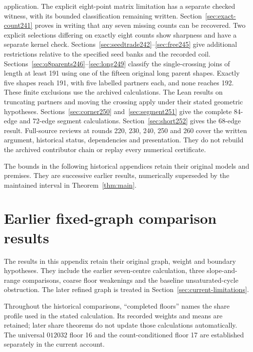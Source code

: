 \documentclass[11pt,a4paper]{article}
\theoremstyle{definition}
\theoremstyle{remark}
\begin{document}
application. The explicit eight-point matrix limitation has a separate
checked witness, with its bounded classification remaining written.
Section~\ref{sec:exact-count241} proves in writing that any seven
missing counts can be recovered. Two explicit selections differing on
exactly eight counts show sharpness and have a separate kernel check.
Sections~\ref{sec:seedtrade242}--\ref{sec:free245} give additional
restrictions relative to the specified seed banks and the recorded coil.
Sections~\ref{sec:q8parents246}--\ref{sec:long249} classify the
single-crossing joins of length at least 191 using one of the fifteen
original long parent shapes. Exactly five shapes reach 191, with five
labelled partners each, and none reaches 192. These finite exclusions
use the archived calculations. The Lean results on truncating partners
and moving the crossing apply under their stated geometric hypotheses.
Sections~\ref{sec:corner250} and~\ref{sec:segment251} give the complete
84-edge and 72-edge segment calculations. Section~\ref{sec:short252} gives the 68-edge result.
Full-source reviews at rounds 220, 230, 240, 250 and 260 cover the written argument,
historical status, dependencies and presentation. They do not rebuild the
archived contributor chain or replay every numerical certificate.


\appendix
The bounds in the following historical appendices retain their original
models and premises. They are successive earlier results, numerically
superseded by the maintained interval in Theorem~\ref{thm:main}.

\section{Earlier fixed-graph comparison results}\label{app:historical-comparisons}
The results in this appendix retain their original graph, weight and boundary
hypotheses. They include the earlier seven-centre calculation, three
slope-and-range comparisons, coarse floor weakenings and the baseline
unsaturated-cycle obstruction. The later refined graph is treated in
Section~\ref{sec:current-limitations}.

Throughout the historical comparisons, ``completed floors'' names the
share profile used in the stated calculation. Its recorded weights and
means are retained; later share theorems do not update those calculations
automatically. The universal $012032$ floor 16 and the count-conditioned
floor 17 are established separately in the current account.
\end{document}
